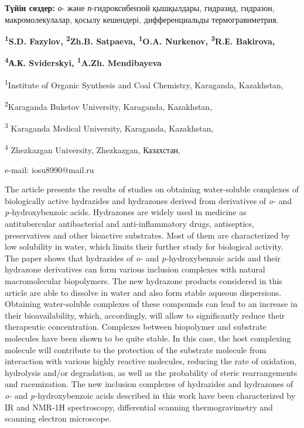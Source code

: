 {\bfseries Түйін сөздер:} \emph{о}- және \emph{п}-гидроксибензой
қышқылдары, гидразид, гидразон, макромолекулалар, қосылу кешендері,
дифференциальды термогравиметрия.


\begin{center}
{\bfseries \textsuperscript{1}S.D. Fazylov, \textsuperscript{2}Zh.B.
Satpaeva, \textsuperscript{1}O.A. Nurkenov, \textsuperscript{3}R.Е.
Bakirova,}

{\bfseries \textsuperscript{4}А.К. Sviderskyi, \textsuperscript{1}A.Zh.
Mendibayeva}

\textsuperscript{1}Institute of Organic Synthesis and Coal Chemistry,
Karaganda, Kazakhstan,

\textsuperscript{2}Karaganda Buketov University, Karaganda, Kazakhstan,

\textsuperscript{3} Karaganda Medical University, Karaganda, Kazakhstan,

\textsuperscript{4} Zhezkazgan University, Zhezkazgan, Казахстан,

e-mail: iosu8990@mail.ru
\end{center}

The article presents the results of studies on obtaining water-soluble
complexes of biologically active hydrazides and hydrazones derived from
derivatives of \emph{o-} and \emph{p-}hydroxybenzoic acids. Hydrazones
are widely used in medicine as antitubercular antibacterial and
anti-inflammatory drugs, antiseptics, preservatives and other bioactive
substrates. Most of them are characterized by low solubility in water,
which limits their further study for biological activity. The paper
shows that hydrazides of \emph{o-} and \emph{p-}hydroxybenzoic acids and
their hydrazone derivatives can form various inclusion complexes with
natural macromolecular biopolymers. The new hydrazone products
considered in this article are able to dissolve in water and also form
stable aqueous dispersions. Obtaining water-soluble complexes of these
compounds can lead to an increase in their bioavailability, which,
accordingly, will allow to significantly reduce their therapeutic
concentration. Complexes between biopolymer and substrate molecules have
been shown to be quite stable. In this case, the host complexing
molecule will contribute to the protection of the substrate molecule
from interaction with various highly reactive molecules, reducing the
rate of oxidation, hydrolysis and/or degradation, as well as the
probability of steric rearrangements and racemization. The new inclusion
complexes of hydrazides and hydrazones of \emph{o-} and
\emph{p-}hydroxybenzoic acids described in this work have been
characterized by IR and NMR-1H spectroscopy, differential scanning
thermogravimetry and scanning electron microscope.

